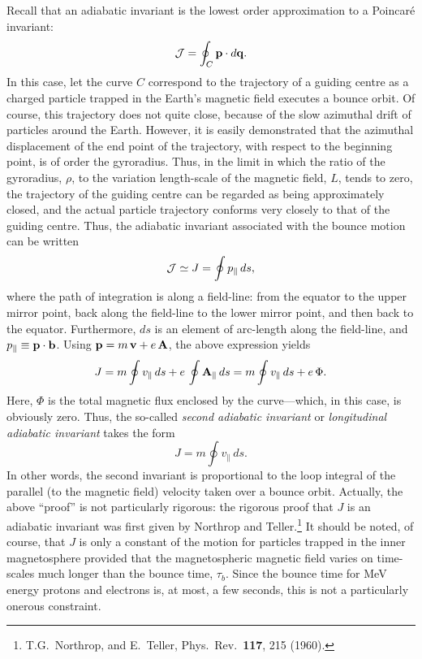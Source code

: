 Recall that an adiabatic invariant is the lowest order approximation
to a Poincar\'{e} invariant:
\begin{equation}
{\cal J} = \oint_C {\bf p}\cdot d{\bf q}.
\end{equation}
In this case, let the curve $C$ correspond to the trajectory of
a guiding centre  as a charged
particle trapped in the
Earth's magnetic field 
executes a bounce orbit. Of course, this trajectory does not quite close,
because of the slow azimuthal drift of particles around the Earth. However,
it is easily demonstrated that 
the azimuthal displacement of the end point of the trajectory, with respect to
the beginning point, is of order the gyroradius. Thus, in the limit
in which the ratio of the gyroradius, $\rho$, to the variation length-scale of the
magnetic field,  $L$, tends to zero, the trajectory of the guiding centre
can be regarded as being  approximately closed,
 and the actual particle trajectory conforms very closely
to that of the guiding centre. Thus, the adiabatic invariant associated with
the bounce motion can be written
\begin{equation}
{\cal J} \simeq J = \oint p_\parallel\,ds,
\end{equation}
where the path of integration is along a field-line: from the equator to
the upper mirror point, back along the field-line to the lower mirror point, and
then back 
to the equator. Furthermore, $ds$ is an element of arc-length along the
field-line, and $p_\parallel\equiv {\bf p}\cdot{\bf b}$. 
Using ${\bf p} = m\,{\bf v} + e\,{\bf A}$, the above
expression yields
\begin{equation}
J = m\oint v_\parallel\,ds + e\,\oint {\bf A}_\parallel \,ds 
= m\oint v_\parallel\,ds + e\,{\Phi}.
\end{equation}
Here, ${\Phi}$ is the total magnetic flux enclosed by the curve---which,
in this case, is obviously zero. Thus, the so-called {\em second adiabatic
invariant}\/ or {\em longitudinal adiabatic invariant}\/ takes the form
\begin{equation}
J = m\oint v_\parallel\,ds.
\end{equation}
In other words, the second invariant is proportional to the loop integral
of the parallel (to the magnetic field) velocity taken over a bounce orbit.
Actually,  the above ``proof'' is not particularly  rigorous: the rigorous proof
that $J$ is an adiabatic invariant was first given by Northrop and Teller.\footnote{
T.G.~Northrop, and E.~Teller, Phys.\ Rev.\ {\bf 117}, 215 (1960).} It should
be noted, of course, that $J$ is only a constant of the motion
for particles trapped in the inner magnetosphere  provided that the
magnetospheric
magnetic field  varies on time-scales much longer than the bounce time,
$\tau_b$. Since the bounce time for MeV energy protons and electrons is,
at most, a few seconds, this is not a particularly onerous constraint.

